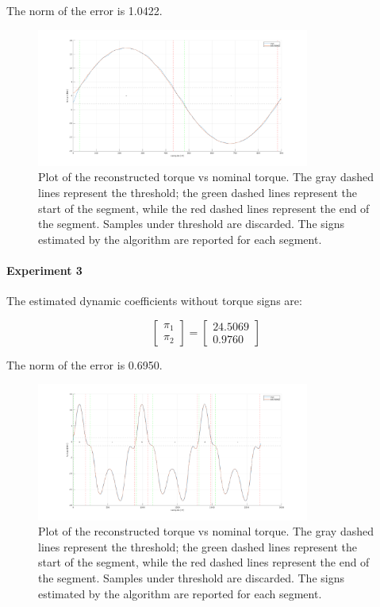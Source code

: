 \documentclass{article}
\begin{document}
The norm of the error is 1.0422.
\begin{figure}[!htbp]
\centering
\includegraphics[width=0.8\textwidth]{images/1-dof/results_new_experiment2.png}
\caption{Plot of the reconstructed torque vs nominal torque. The gray dashed lines represent the threshold; the green dashed lines represent the start of the segment, while the red dashed lines represent the end of the segment. Samples under threshold are discarded. The signs estimated by the algorithm are reported for each segment.}
\end{figure}
\FloatBarrier
\paragraph{Experiment 3} The estimated dynamic coefficients without torque signs are:

\[\begin{bmatrix}
\pi_1  \\ \pi_2 
\end{bmatrix}=\begin{bmatrix}
24.5069 \\ 0.9760
\end{bmatrix}\]

The norm of the error is 0.6950.
\begin{figure}[!htbp]
\centering
\includegraphics[width=0.8\textwidth]{images/1-dof/results_new_experiment3.png}
\caption{Plot of the reconstructed torque vs nominal torque. The gray dashed lines represent the threshold; the green dashed lines represent the start of the segment, while the red dashed lines represent the end of the segment. Samples under threshold are discarded. The signs estimated by the algorithm are reported for each segment.}
\end{figure}
\FloatBarrier
\end{document}
